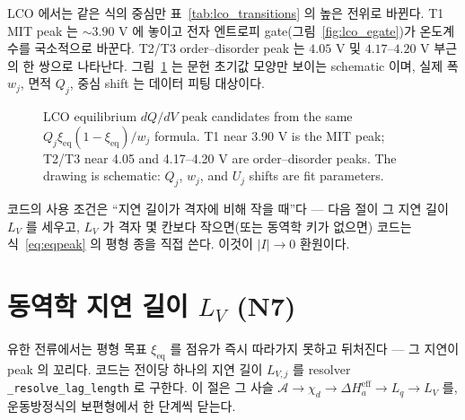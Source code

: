 \documentclass[11pt,a4paper]{article}
\newcommand{\eff}{\mathrm{eff}}
\newcommand{\eq}{\mathrm{eq}}
\newcommand{\code}[1]{\texttt{#1}}
\begin{document}
LCO 에서는 같은 식의 중심만 표~\ref{tab:lco_transitions} 의 높은 전위로 바뀐다. T1 MIT peak 는
$\sim3.90$ V 에 놓이고 전자 엔트로피 gate(그림~\ref{fig:lco_egate})가 온도계수를 국소적으로 바꾼다. T2/T3
order--disorder peak 는 $4.05$ V 및 $4.17$--$4.20$ V 부근의 한 쌍으로 나타난다. 그림~\ref{fig:lco_peaks} 는
문헌 초기값 모양만 보이는 schematic 이며, 실제 폭 $w_j$, 면적 $Q_j$, 중심 shift 는 데이터 피팅 대상이다.

\begin{figure}[t]
\centering
{}
\caption{LCO equilibrium $dQ/dV$ peak candidates from the same $Q_j\xi_\eq(1-\xi_\eq)/w_j$ formula.
T1 near 3.90 V is the MIT peak; T2/T3 near 4.05 and 4.17--4.20 V are order--disorder peaks.
The drawing is schematic: $Q_j$, $w_j$, and $U_j$ shifts are fit parameters.}
\label{fig:lco_peaks}
\end{figure}

코드의 사용 조건은 ``지연 길이가 격자에 비해 작을 때''다 — 다음 절이 그 지연 길이 $L_V$ 를 세우고, $L_V$ 가 격자
몇 칸보다 작으면(또는 동역학 키가 없으면) 코드는 식~\eqref{eq:eqpeak} 의 평형 종을 직접 쓴다. 이것이 $|I|\to0$ 환원이다.

\section{동역학 지연 길이 $L_V$ (N7)}\label{sec:lag}
유한 전류에서는 평형 목표 $\xi_\eq$ 를 점유가 즉시 따라가지 못하고 뒤처진다 — 그 지연이 peak 의 꼬리다. 코드는 전이당
하나의 지연 길이 $L_{V,j}$ 를 resolver \code{\_resolve\_lag\_length} 로 구한다. 이 절은 그 사슬
$\mathcal A\to\chi_d\to\Delta H_a^\eff\to L_q\to L_V$ 를, 운동방정식의 보편형에서 한 단계씩 닫는다.
\end{document}
